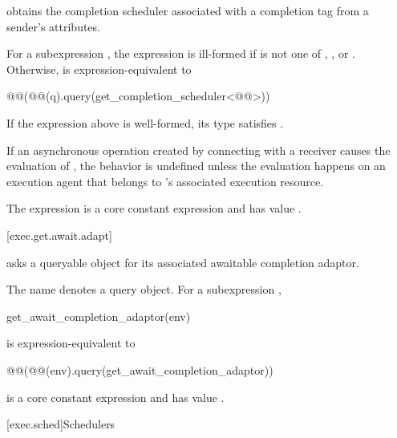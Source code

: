 \pnum
{} obtains
the completion scheduler associated with a completion tag
from a sender's attributes.

\pnum
For a subexpression ,
the expression 
is ill-formed if  is not one of
, , or .
Otherwise, 
is expression-equivalent to
\begin{codeblock}
@@(@@(q).query(get_completion_scheduler<@@>))
\end{codeblock}
\mandates
If the expression above is well-formed,
its type satisfies .

\pnum
If an asynchronous operation
created by connecting  with a receiver 
causes the evaluation of ,
the behavior is undefined
unless the evaluation happens on an execution agent
that belongs to 's associated execution resource.

\pnum
The expression
is a core constant expression and has value .

[exec.get.await.adapt]{}

\pnum
{} asks a queryable object for
its associated awaitable completion adaptor.

\pnum
The name  denotes a query object.
For a subexpression ,
\begin{codeblock}
get_await_completion_adaptor(env)
\end{codeblock}
is expression-equivalent to
\begin{codeblock}
@@(@@(env).query(get_await_completion_adaptor))
\end{codeblock}

\pnum
{}
is a core constant expression and has value .

[exec.sched]{Schedulers}

